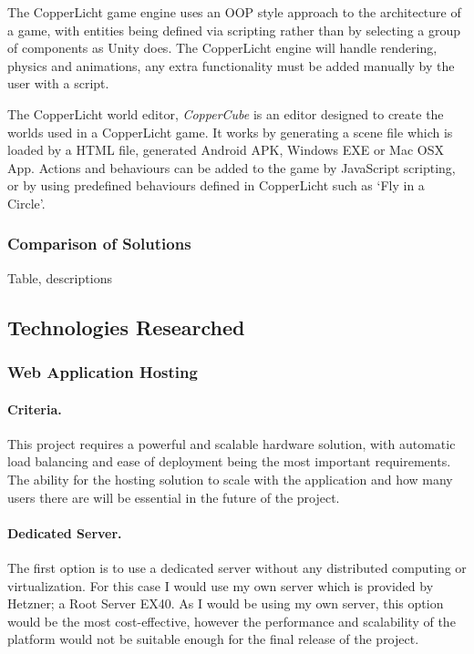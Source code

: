 \documentclass[a4paper, 12pt]{article}
\begin{document}
The CopperLicht game engine uses an OOP style approach to the architecture of a game, with entities being defined via scripting rather than by selecting a group of components as Unity does. The CopperLicht engine will handle rendering, physics and animations, any extra functionality must be added manually by the user with a script.\cite{copperlichtfeatures}

The CopperLicht world editor, \emph{CopperCube} is an editor designed to create the worlds used in a CopperLicht game. It works by generating a scene file which is loaded by a HTML file, generated Android APK, Windows EXE or Mac OSX App.\cite{coppercubefeatures} Actions and behaviours can be added to the game by JavaScript scripting, or by using predefined behaviours defined in CopperLicht such as `Fly in a Circle'.\cite{copperlichtbehaviours}

\subsubsection{Comparison of Solutions}
Table, descriptions

\subsection{Technologies Researched}
\subsubsection{Web Application Hosting}
\paragraph{Criteria.}
This project requires a powerful and scalable hardware solution, with automatic load balancing and ease of deployment being the most important requirements. The ability for the hosting solution to scale with the application and how many users there are will be essential in the future of the project.

\paragraph{Dedicated Server.}
The first option is to use a dedicated server without any distributed computing or virtualization. For this case I would use my own server which is provided by Hetzner; a Root Server EX40. As I would be using my own server, this option would be the most cost-effective, however the performance and scalability of the platform would not be suitable enough for the final release of the project.
\end{document}
